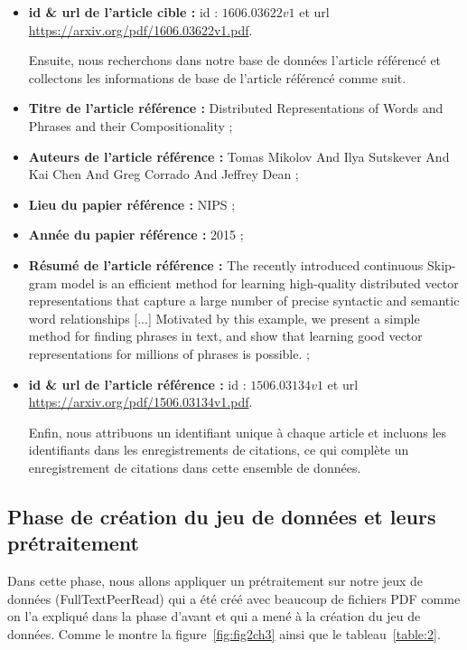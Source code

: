 \begin{itemize}[label=•]
            \item   \textbf{id \& url de l'article cible :} id : $1606.03622v1$ et url \url{https://arxiv.org/pdf/1606.03622v1.pdf}.
            
            \par Ensuite, nous recherchons dans notre base de données l'article référencé et collectons les informations de base de l'article référencé comme suit.
            
            \item   \textbf{Titre de l'article référence :} Distributed Representations of Words and Phrases and their Compositionality ;
            \item   \textbf{Auteurs de l'article référence :} Tomas Mikolov And Ilya Sutskever And Kai Chen And Greg Corrado And Jeffrey Dean ;
            \item   \textbf{Lieu du papier référence :} NIPS ;
            \item   \textbf{Année du papier référence : } 2015 ;
            \item   \textbf{Résumé de l'article référence :} The recently introduced continuous Skip-gram model is an efficient method for learning high-quality distributed vector representations that capture a large number of precise syntactic and semantic word relationships [...] Motivated by this example, we present a simple method for finding phrases in text, and show that learning good vector representations for millions of phrases is possible. ;
            \item   \textbf{id \& url de l'article référence :} id : $1506.03134v1$ et url \url{https://arxiv.org/pdf/1506.03134v1.pdf}.
            
            \par Enfin, nous attribuons un identifiant unique à chaque article et incluons les identifiants dans les enregistrements de citations, ce qui complète un enregistrement de citations dans cette ensemble de données.
        \end{itemize}
        
        \subsection{Phase de création du jeu de données et leurs prétraitement }
        \par Dans cette phase, nous allons appliquer un prétraitement sur notre jeux de données (FullTextPeerRead) qui a été créé avec beaucoup de fichiers PDF comme on l'a expliqué dans la phase d'avant et qui a mené à la création du jeu de données. Comme le montre la figure~\ref{fig:fig2ch3} ainsi que le tableau~\ref{table:2}.
    

